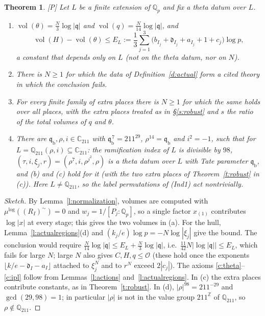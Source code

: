 \documentclass[11pt]{article}
\theoremstyle{plain}
\newtheorem{theorem}{Theorem}
\theoremstyle{definition}
\theoremstyle{remark}
\newcommand{\Pmark}{\textup{[P]}}
\newcommand{\vol}{\operatorname{vol}}
\newcommand{\cO}{\mathcal O}
\newcommand{\Qp}[1]{\mathbb Q_{#1}}
\newcommand{\tI}{(R_I)^{\sim}}
\newcommand{\fq}{\mathfrak q}
\begin{document}
\begin{theorem}\label{t:actual}
\Pmark{} Let $L$ be a finite extension of $\Qp p$ and fix a theta datum over $L$.
\begin{enumerate}[label=(\alph*)]
\item $\vol(\theta)=\frac N3\log|\fq|$ and $\vol(q)=\frac N{14}\log|\fq|$, and
  \[
  \vol(H)-\vol(\theta)\le E_L:=\frac13\sum_{j=1}^{3}
  \bigl(b_{I_j}+\mathfrak d_{I_j}+a_{I_j}+1+c_j\bigr)\log p,
  \]
  a constant that depends only on $L$ (not on the theta datum, nor on $N$).
\item There is $N\ge1$ for which the data of Definition~\ref{d:actual} form a cited theory
  in which the conclusion fails.
\item For every finite family of extra places there is $N\ge1$ for which the same holds over
  all places, with the extra places treated as in \S\ref{s:robust} and $s$ the ratio of the
  total volumes of $q$ and $\theta$.
\item There are $\fq_{\mathrm b},\rho,i\in\mathbb C_{211}$ with
  $\fq_{\mathrm b}^{\,7}=211^{29}$, $\rho^{14}=\fq_{\mathrm b}$ and $i^2=-1$, such that for
  $L=\Qp{211}(\rho,i)\subseteq\mathbb C_{211}$: the ramification index of $L$ is divisible by
  $98$, $(\tau,i,\xi_j,r)=(\rho^7,i,\rho^{j^2},\rho)$ is a theta datum over $L$ with Tate
  parameter $\fq_{\mathrm b}$, and (b) and (c) hold for it (with the two extra places of
  Theorem~\ref{t:robust} in (c)). Here $L\ne\Qp{211}$, so the label permutations of (Ind1)
  act nontrivially.
\end{enumerate}
\end{theorem}

\begin{proof}[Sketch]
By Lemma~\ref{l:normalization}, volumes are computed with $\mu^{\log}(\tI)=0$ and
$w_j=1/[P_j:\Qp p]$, so a single factor $x_{(1)}$ contributes $\log|x|$ at every stage;
this gives the two volumes in (a). For the hull, Lemma~\ref{l:actualregions}(d) and
$(k_j/e)\log p=-N\log|\xi_j|$ give the bound. The conclusion would require
$\frac N{14}\log|\fq|\le E_L+\frac N3\log|\fq|$, i.e.\ $\frac{11}{42}N|\log|\fq||\le E_L$,
which fails for large $N$; large $N$ also gives $C,H,q\le\cO$ (these hold once the exponents
$\lfloor k/e-\mathfrak d_I-a_I\rfloor$ attached to $\xi_j^N$ and to $r^N$ exceed
$2|c_j|$). The axioms \ref{c:theta}--\ref{c:ipl}
follow from Lemmas~\ref{l:actions} and~\ref{l:actualregions}. In (c) the extra places
contribute constants, as in Theorem~\ref{t:robust}. In (d), $|\rho|^{98}=211^{-29}$ and
$\gcd(29,98)=1$; in particular $|\rho|$ is not in the value group $211^{\mathbb Z}$ of
$\Qp{211}$, so $\rho\notin\Qp{211}$.
\end{proof}
\end{document}
